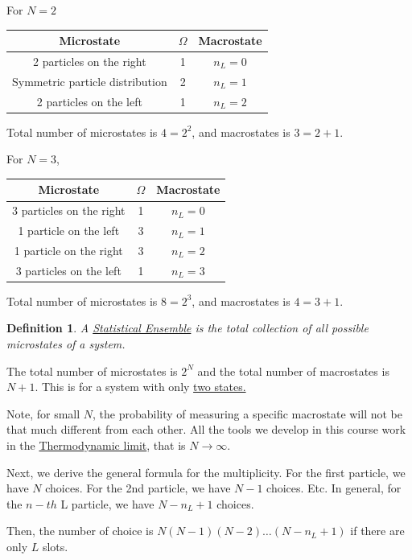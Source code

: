 \documentclass{article}
\newtheorem{definition}[theorem]{Definition}
\newtheorem{one minute paper}[theorem]{One Minute Paper}
\begin{document}
For $N=2$
\begin{center}
\begin{tabular}{|c c c|} 
 \hline
 Microstate & $\Omega$ & Macrostate \\ [0.5ex] 
 \hline\hline
 2 particles on the right & 1 & $n_L = 0$ \\ 
 \hline
Symmetric particle distribution & 2 & $n_L = 1$ \\
\hline
2 particles on the left & 1 & $n_L = 2$ \\
\hline
\end{tabular}
\end{center}
Total number of microstates is $4 = 2^2$, and macrostates is $3 = 2 + 1$. 

For $N=3$,
\begin{center}
\begin{tabular}{|c c c|} 
 \hline
 Microstate & $\Omega$ & Macrostate \\ [0.5ex] 
 \hline\hline
 3 particles on the right & 1 & $n_L = 0$ \\ 
 \hline
1 particle on the left & 3 & $n_L = 1$ \\
\hline
1 particle on the right & 3 & $n_L = 2$ \\
\hline
3 particles on the left & 1 & $n_L = 3$ \\
\hline
\end{tabular}
\end{center}
Total number of microstates is $8 = 2^3$, and macrostates is $4 = 3 + 1$. 

\begin{definition}
    A \underline{Statistical Ensemble} is the total collection of all possible microstates of a system.
\end{definition}

The total number of microstates is $2^N$ and the total number of macrostates is $N+1$. 
This is for a system with only \underline{two states.}

Note, for small $N$, the probability of measuring a specific macrostate will not be that much different from each other. All the tools we develop in this course work in the \underline{Thermodynamic limit}, that is $N \rightarrow \infty$. 

Next, we derive the general formula for the multiplicity. For the first particle, we have $N$ choices. For the 2nd particle, we have $N-1$ choices. Etc. In general, for the $n-th$ L particle, we have $N- n_L + 1$ choices. 

Then, the number of choice is $N(N-1)(N-2)\dots(N - n_L + 1)$ if there are only $L$ slots.  
\end{document}
